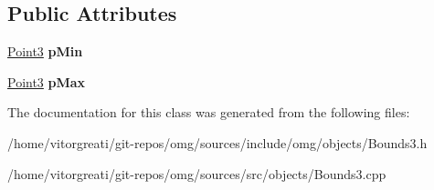 \subsection*{Public Attributes}
\begin{DoxyCompactItemize}
\item 
\mbox{\label{classomg_1_1_bounds3_a6ccd4b172b8daa976fb75d9864934977}} 
\mbox{\hyperlink{namespaceomg_af85242d35fdacf829d32a6f9b95f3e35}{Point3}} {\bfseries p\+Min}
\item 
\mbox{\label{classomg_1_1_bounds3_a9cda721148a1a768eeb906df14fc41b2}} 
\mbox{\hyperlink{namespaceomg_af85242d35fdacf829d32a6f9b95f3e35}{Point3}} {\bfseries p\+Max}
\end{DoxyCompactItemize}


The documentation for this class was generated from the following files\+:\begin{DoxyCompactItemize}
\item 
/home/vitorgreati/git-\/repos/omg/sources/include/omg/objects/Bounds3.\+h\item 
/home/vitorgreati/git-\/repos/omg/sources/src/objects/Bounds3.\+cpp\end{DoxyCompactItemize}
